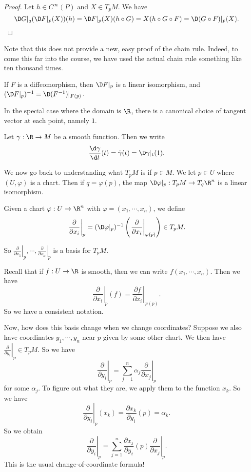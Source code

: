 \documentclass[a4paper]{article}
\begin{document}
\begin{proof}
  Let $h \in C^\infty(P)$ and $X \in T_p M$. We have
  \[
    \D G|_q (\D F|_p (X))(h) = \D F|_p(X) (h \circ G) = X(h \circ G \circ F) = \D (G \circ F)|_p (X). \qedhere
  \]
\end{proof}
Note that this does not provide a new, easy proof of the chain rule. Indeed, to come this far into the course, we have used the actual chain rule something like ten thousand times.

\begin{cor}
  If $F$ is a diffeomorphism, then $\D F|_p$ is a linear isomorphism, and $(\D F|_p)^{-1} = \D (F^{-1})|_{F(p)}$.
\end{cor}

In the special case where the domain is $\R$, there is a canonical choice of tangent vector at each point, namely $1$.
\begin{defi}[Derivative]
  Let $\gamma: \R \to M$ be a smooth function. Then we write
  \[
    \frac{\d \gamma}{\d t}(t) = \dot{\gamma}(t) = \D \gamma|_t (1).
  \]
\end{defi}

We now go back to understanding what $T_pM$ is if $p \in M$. We let $p \in U$ where $(U, \varphi)$ is a chart. Then if $q = \varphi(p)$, the map $\D\varphi|_p: T_p M \to T_q \R^n$ is a linear isomorphism.

\begin{defi}
  Given a chart $\varphi: U \to \R^n$ with $\varphi = (x_1, \cdots, x_n)$, we define
  \[
    \left.\frac{\partial}{\partial x_i}\right|_p = (\D \varphi|_p)^{-1} \left(\left.\frac{\partial}{\partial x_i}\right|_{\varphi(p)}\right) \in T_p M.
  \]
\end{defi}
So $\left.\frac{\partial}{\partial x_1}\right|_p, \cdots, \left.\frac{\partial}{\partial x_n}\right|_p$ is a basis for $T_p M$.

Recall that if $f: U \to \R$ is smooth, then we can write $f(x_1, \cdots, x_n)$. Then we have
\[
  \left.\frac{\partial}{\partial x_i}\right|_p (f) = \left.\frac{\partial f}{\partial x_i}\right|_{\varphi(p)}.
\]
So we have a consistent notation.

Now, how does this basis change when we change coordinates? Suppose we also have coordinates $y_1, \cdots, y_n$ near $p$ given by some other chart. We then have $\left.\frac{\partial}{\partial y_i}\right|_p \in T_p M$. So we have
\[
  \left.\frac{\partial}{\partial y_i}\right|_p = \sum_{j = 1}^n \alpha_j \left.\frac{\partial}{\partial x_j}\right|_p
\]
for some $\alpha_j$. To figure out what they are, we apply them to the function $x_k$. So we have
\[
  \left.\frac{\partial}{\partial y_i}\right|_p (x_k) = \frac{\partial x_k}{\partial y_i}(p) = \alpha_k.
\]
So we obtain
\[
  \left.\frac{\partial}{\partial y_i}\right|_p = \sum_{j = 1}^n \frac{\partial x_j}{\partial y_i}(p)\left.\frac{\partial}{\partial x_j}\right|_p.
\]
This is the usual change-of-coordinate formula!
\end{document}
